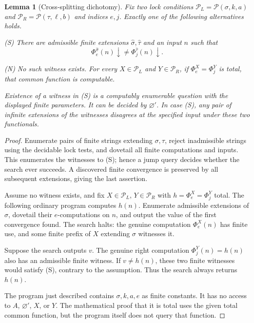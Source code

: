 \documentclass[11pt,a4paper]{article}
\newcommand{\Pcond}{\mathcal P}
\newtheorem{lemma}[theorem]{Lemma}
\theoremstyle{definition}\newtheorem{definition}[theorem]{Definition}
\theoremstyle{remark}\newtheorem{remark}[theorem]{Remark}
\begin{document}
\begin{lemma}[Cross-splitting dichotomy]\label{lem:split}
Fix two lock conditions $\Pcond_L=\Pcond(\sigma,k,a)$ and
$\Pcond_R=\Pcond(\tau,\ell,b)$ and indices $e,j$. Exactly one of the following alternatives holds.

\textup{(S)} There are admissible finite extensions $\widehat\sigma,\widehat\tau$ and an input $n$ such that
\[
 \Phi_e^{\widehat\sigma}(n)\downarrow\ne
 \Phi_j^{\widehat\tau}(n)\downarrow.
\]

\textup{(N)} No such witness exists. For every $X\in\Pcond_L$ and $Y\in\Pcond_R$, if $\Phi_e^X=\Phi_j^Y$ is total, that common function is computable.

Existence of a witness in \textup{(S)} is a computably enumerable question with the displayed finite parameters. It can be decided by $\varnothing'$. In case \textup{(S)}, any pair of infinite extensions of the witnesses disagrees at the specified input under these two functionals.
\end{lemma}
\begin{proof}
Enumerate pairs of finite strings extending $\sigma,\tau$, reject inadmissible strings using the decidable lock tests, and dovetail all finite computations and inputs. This enumerates the witnesses to (S); hence a jump query decides whether the search ever succeeds. A discovered finite convergence is preserved by all subsequent extensions, giving the last assertion.

Assume no witness exists, and fix $X\in\Pcond_L$, $Y\in\Pcond_R$ with
$h=\Phi_e^X=\Phi_j^Y$ total. The following ordinary program computes $h(n)$. Enumerate admissible extensions of $\sigma$, dovetail their $e$-computations on $n$, and output the value of the first convergence found. The search halts: the genuine computation $\Phi_e^X(n)$ has finite use, and some finite prefix of $X$ extending $\sigma$ witnesses it.

Suppose the search outputs $v$. The genuine right computation $\Phi_j^Y(n)=h(n)$ also has an admissible finite witness. If $v\ne h(n)$, these two finite witnesses would satisfy (S), contrary to the assumption. Thus the search always returns $h(n)$.

The program just described contains $\sigma,k,a,e$ as finite constants. It has no access to $A$, $\varnothing'$, $X$, or $Y$. The mathematical proof that it is total uses the given total common function, but the program itself does not query that function.
\end{proof}
\end{document}
